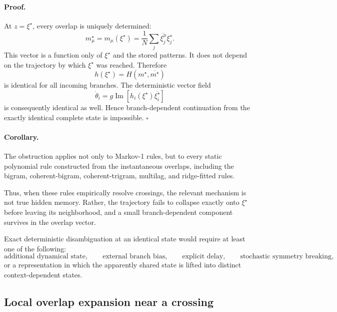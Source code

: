 \paragraph{Proof.}
At $z=\xi^\star$, every overlap is uniquely determined:
\begin{equation}
m_\mu^\star
=
m_\mu(\xi^\star)
=
\frac{1}{N}
\sum_j
\overline{\xi_j^\mu}\xi_j^\star.
\end{equation}
This vector is a function only of $\xi^\star$ and the stored patterns.  It does
not depend on the trajectory by which $\xi^\star$ was reached.  Therefore
\begin{equation}
h(\xi^\star)
=
H(m^\star,\overline{m^\star})
\end{equation}
is identical for all incoming branches.  The deterministic vector field
\begin{equation}
\dot{\theta}_i
=
g\operatorname{Im}
\left[
h_i(\xi^\star)\overline{\xi_i^\star}
\right]
\end{equation}
is consequently identical as well.  Hence branch-dependent continuation from
the exactly identical complete state is impossible. \hfill$\square$

\paragraph{Corollary.}
The obstruction applies not only to Markov-1 rules, but to every static
polynomial rule constructed from the instantaneous overlaps, including the
bigram, coherent-bigram, coherent-trigram, multilag, and ridge-fitted rules.

Thus, when these rules empirically resolve crossings, the relevant mechanism is
not true hidden memory.  Rather, the trajectory fails to collapse exactly onto
$\xi^\star$ before leaving its neighborhood, and a small branch-dependent
component survives in the overlap vector.

Exact deterministic disambiguation at an identical state would require at
least one of the following:
\begin{equation}
\text{additional dynamical state},\qquad
\text{external branch bias},\qquad
\text{explicit delay},\qquad
\text{stochastic symmetry breaking},
\end{equation}
or a representation in which the apparently shared state is lifted into
distinct context-dependent states.

\subsection{Local overlap expansion near a crossing}

